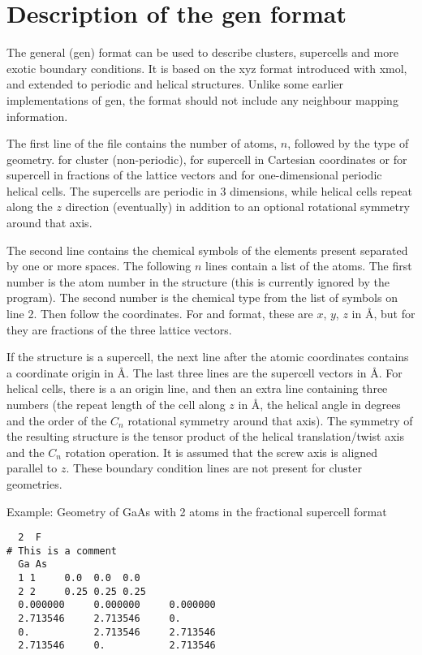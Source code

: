 
\chapter{Description of the gen format}
\label{app:gen}

The general (gen) format can be used to describe clusters, supercells and more
exotic boundary conditions. It is based on the xyz format introduced with xmol,
and extended to periodic and helical structures. Unlike some earlier
implementations of gen, the format should not include any neighbour mapping
information.

The first line of the file contains the number of atoms, $n$, followed by the
type of geometry.  for cluster (non-periodic),  for supercell in
Cartesian coordinates or  for supercell in fractions of the lattice
vectors and  for one-dimensional periodic helical cells. The supercells
are periodic in 3 dimensions, while helical cells repeat along the $z$ direction
(eventually) in addition to an optional rotational symmetry around that axis.

The second line contains the chemical symbols of the elements present
separated by one or more spaces.  The following $n$ lines contain a
list of the atoms. The first number is the atom number in the
structure (this is currently ignored by the program). The second
number is the chemical type from the list of symbols on line 2. Then
follow the coordinates. For  and  format, these are $x$,
$y$, $z$ in {\AA}, but for  they are fractions of the three
lattice vectors.

If the structure is a supercell, the next line after the atomic coordinates
contains a coordinate origin in {\AA}. The last three lines are the supercell
vectors in {\AA}. For helical cells, there is a an origin line, and then an
extra line containing three numbers (the repeat length of the cell along $z$ in
{\AA}, the helical angle in degrees and the order of the $C_n$ rotational
symmetry around that axis). The symmetry of the resulting structure is the
tensor product of the helical translation/twist axis and the $C_n$ rotation
operation. It is assumed that the screw axis is aligned parallel to $z$. These
boundary condition lines are not present for cluster geometries.

Example: Geometry of GaAs with 2 atoms in the fractional supercell
format
\begin{verbatim}
  2  F
# This is a comment
  Ga As
  1 1     0.0  0.0  0.0
  2 2     0.25 0.25 0.25
  0.000000     0.000000     0.000000
  2.713546     2.713546     0.      
  0.           2.713546     2.713546
  2.713546     0.           2.713546
\end{verbatim}

